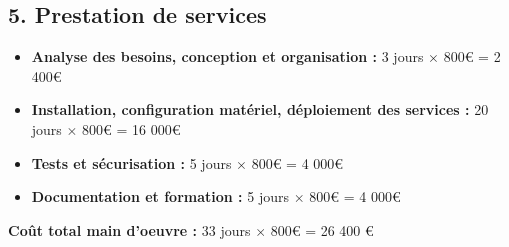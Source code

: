 \documentclass{report}
\begin{document}
\subsection*{5. Prestation de services}
\vspace{0.2cm}
\begin{itemize}
    \item \textbf{Analyse des besoins, conception et organisation :} 3 jours $\times$ 800€ = 2 400€
    \item \textbf{Installation, configuration matériel, déploiement des services :} 20 jours $\times$ 800€ = 16 000€
    \item \textbf{Tests et sécurisation :} 5 jours $\times$ 800€ = 4 000€
    \item \textbf{Documentation et formation :} 5 jours $\times$ 800€ = 4 000€
\end{itemize}
\vspace{0.2cm}
\noindent \textbf{Coût total main d'oeuvre :} 33 jours $\times$ 800€ = 26 400 €
\vspace{1cm}
\end{document}
